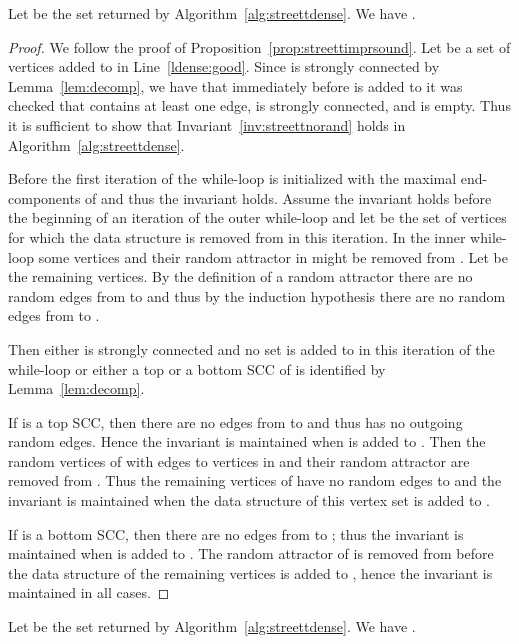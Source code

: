 \documentclass[11pt,letterpaper]{article}
\begin{document}
\begin{proposition}\label{prop:streettdensesound}
	Let  be the set returned by Algorithm~\ref{alg:streettdense}.
	We have .
\end{proposition}

\begin{proof}
	We follow the proof of Proposition~\ref{prop:streettimprsound}. 
	Let  be a set of vertices added to  in Line~\ref{ldense:good}. 
	Since  is strongly connected by 
	Lemma~\ref{lem:decomp}, we have that
	immediately before  is added to  it was checked that
	 contains at least one edge, is strongly connected, and 
	is empty. Thus it is sufficient to show that Invariant~\ref{inv:streettnorand} holds
	in Algorithm~\ref{alg:streettdense}. 
	
	Before the first iteration of the while-loop  is initialized with
the maximal end-components of  and thus the invariant holds. 
Assume the invariant holds before the beginning of an iteration of the outer while-loop
and let  be the set of vertices for which the data structure 
is removed from  in this iteration. In the inner while-loop some vertices 
and their random attractor in  might be removed from . Let  be 
the remaining vertices. By the definition of a random attractor there are no 
random edges from  to  and thus by the induction hypothesis
there are no random edges from  to .

Then either  is strongly connected and no set is added to  in 
this iteration of the while-loop or either a top or a bottom SCC  of 
is identified by Lemma~\ref{lem:decomp}.

If  is a top SCC, then there are no edges from  
to  and thus  has no outgoing random edges.
Hence the invariant is maintained when  is added to .
Then the random vertices of  with edges to vertices in  and 
their random attractor are removed from . Thus the remaining vertices
of  have no random edges to  and the invariant is maintained
when the data structure of this vertex set is added to .

If  is a bottom SCC, then there are no edges from  to ;
thus the invariant is maintained when  is added to . The random
attractor of  is removed from  before the data structure of 
the remaining vertices is added to , hence the invariant is maintained in all 
cases.
\end{proof}

\begin{proposition}\label{prop:streettdensecompl}
		Let  be the set returned by Algorithm~\ref{alg:streettdense}.
	We have .
\end{proposition}
\end{document}
